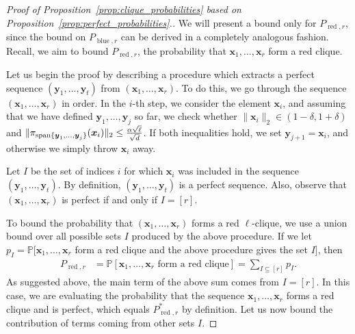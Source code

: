 \documentclass[11pt]{amsart}
\theoremstyle{definition}
\def\Pb{\mathbb{P}}
\def\bx{\boldsymbol{x}}
\def\by{\boldsymbol{y}}
\DeclareMathOperator{\red}{red}
\DeclareMathOperator{\blue}{blue}
\begin{document}
\begin{proof}[Proof of Proposition~\ref{prop:clique_probabilities} based on Proposition~\ref{prop:perfect_probabilities}.]
We will present a bound only for $P_{\red, r}$, since the bound on $P_{\blue, r}$ can be derived in a completely analogous fashion. Recall, we aim to bound $P_{\red, r}$, the probability that $\bx_1, \dots, \bx_r$ form a red clique.

Let us begin the proof by describing a procedure which extracts a perfect sequence $(\by_1, \dots, \by_t)$ from $(\bx_1, \dots, \bx_r)$. To do this, we go through the sequence $(\bx_1, \dots, \bx_r)$ in order. In the $i$-th step, we consider the element $\bx_i$, and assuming that we have defined $\by_1,\dots, \by_j$ so far, we check whether $\|\bx_i\|_2\in (1-\delta, 1+\delta)$ and $\|\pi_{{\rm span}\{\by_1, \dots, \by_j\}} (\bx_i)\|_2\leq \frac{\alpha \sqrt{\ell}}{\sqrt{d}}$. If both inequalities hold, we set $\by_{j+1}=\bx_i$, and otherwise we simply throw $\bx_i$ away.

Let $I$ be the set of indices $i$ for which $\bx_i$ was included in the sequence $(\by_1, \dots, \by_t)$. By definition, $(\by_1, \dots, \by_t)$ is a perfect sequence. Also, observe that $(\bx_1, \dots, \bx_r)$ is perfect if and only if $I=[r]$.

To bound the probability that $(\bx_1, \dots, \bx_r)$ forms a red $\ell$-clique, we use a union bound over all possible sets $I$ produced by the above procedure. If we let $p_I=\Pb\big[\bx_1, \dots, \bx_r$ form a red clique and the above procedure gives the set $I\big]$, then
{\smaller[0.3]
\begin{align}\label{eqn:union_bound_perfect}
P_{\red, r}&=\Pb[\bx_1, \dots, \bx_r \text{ form a red clique}]= \sum_{I\subseteq [r]} p_I.
\end{align}
}
As suggested above, the main term of the above sum comes from $I=[r]$. In this case, we are evaluating the probability that the sequence $\bx_1, \dots, \bx_r$ forms a red clique and is perfect, which equals $P_{\red, r}^*$ by definition. Let us now bound the contribution of terms coming from other sets $I$.


\end{proof}
\end{document}

